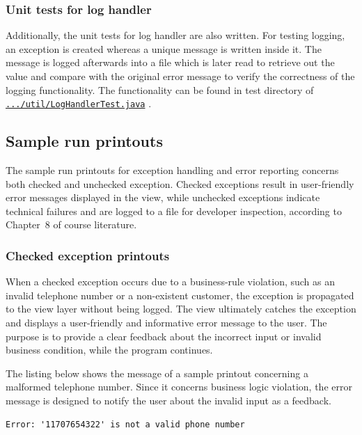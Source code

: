 \documentclass[a4paper]{scrartcl}
\begin{document}
\subsubsection{Unit tests for log handler}
Additionally, the unit tests for log handler are also written. For testing logging, an exception is created whereas a unique message is written inside it. The message is logged afterwards into a file which is later read to retrieve out the value and compare with the original error message to verify the correctness of the logging functionality. The functionality can be found in test directory of \href{https://github.com/mo-mosverkstad/java-learning/blob/34b4b6e965166712b8f64949b998589988aae122/maven-projects/ElectricBikeRepair/src/test/java/se/ebikerepair/util/LogHandlerTest.java}{\nolinkurl{.../util/LogHandlerTest.java}} \cite{sourcecode}.

\subsection{Sample run printouts}

The sample run printouts for exception handling and error reporting concerns both checked and unchecked exception. Checked exceptions result in user-friendly error messages displayed in the view, while unchecked exceptions indicate technical failures and are logged to a file for developer inspection, according to Chapter~8 of course literature.

\subsubsection{Checked exception printouts}

When a checked exception occurs due to a business-rule violation, such as an invalid telephone number or a non-existent customer, the exception is propagated to the view layer without being logged. The view ultimately catches the exception and displays a user-friendly and informative error message to the user. The purpose is to provide a clear feedback about the incorrect input or invalid business condition, while the program continues.

The listing below shows the message of a sample printout concerning a malformed telephone number. Since it concerns business logic violation, the error message is designed to notify the user about the invalid input as a feedback.

\begin{lstlisting}[style=outputstyle, caption={Checked exception as error message}]
Error: '11707654322' is not a valid phone number
\end{lstlisting}
\end{document}
